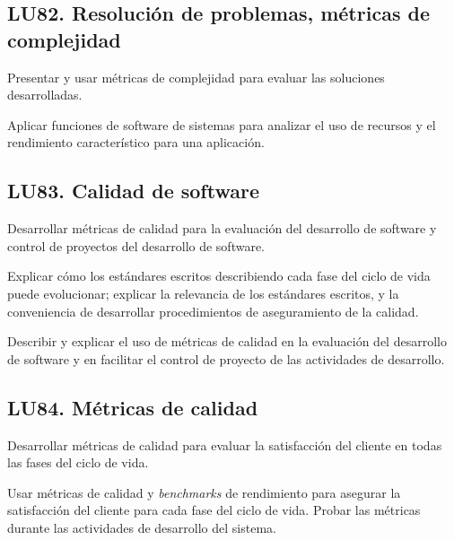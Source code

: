 \subsection{LU82. Resolución de problemas, métricas de complejidad}\label{sec:LU82}
\begin{LearningUnit}
\begin{LUGoal}
\item Presentar y usar métricas de complejidad para evaluar las soluciones desarrolladas.
\end{LUGoal}

\begin{LUObjective}
\item Aplicar funciones de software de sistemas para analizar el uso de recursos y el rendimiento característico para una aplicación.
\end{LUObjective}
\end{LearningUnit}

\subsection{LU83. Calidad de software}\label{sec:LU83}
\begin{LearningUnit}
\begin{LUGoal}
\item Desarrollar métricas de calidad para la evaluación del desarrollo de software y control de proyectos del desarrollo de software.
\end{LUGoal}

\begin{LUObjective}
\item Explicar cómo los estándares escritos describiendo cada fase del ciclo de vida puede evolucionar; explicar la relevancia de los estándares escritos, y la conveniencia de desarrollar procedimientos de aseguramiento de la calidad.
\item Describir y explicar el uso de métricas de calidad en la evaluación del desarrollo de software y en facilitar el control de proyecto de las actividades de desarrollo.
\end{LUObjective}
\end{LearningUnit}

\subsection{LU84. Métricas de calidad}\label{sec:LU84}
\begin{LearningUnit}
\begin{LUGoal}
\item Desarrollar métricas de calidad para evaluar la satisfacción del cliente en todas las fases del ciclo de vida.
\end{LUGoal}

\begin{LUObjective}
\item Usar métricas de calidad y {\it benchmarks} de rendimiento para asegurar la satisfacción del cliente para cada fase del ciclo de vida. Probar las métricas durante las actividades de desarrollo del sistema.
\end{LUObjective}
\end{LearningUnit}

